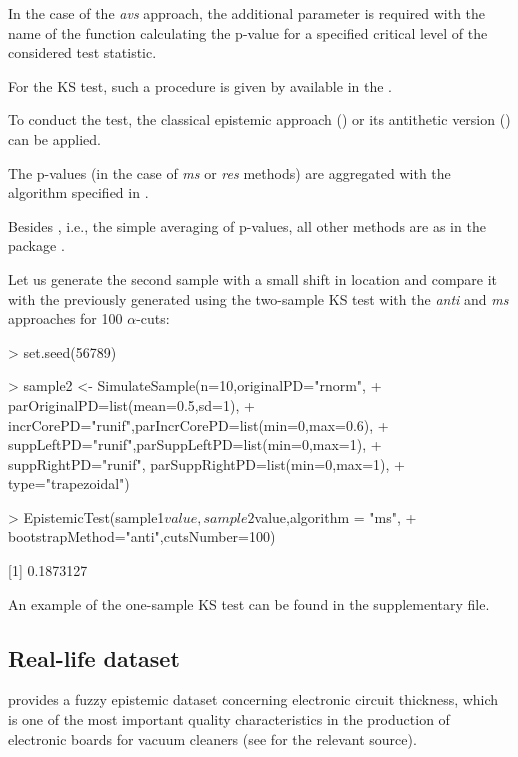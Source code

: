 In the case of the \emph{avs} approach, the additional parameter  is required with the name of the function  calculating the p-value for a specified critical level of the considered test statistic.

For the KS test, such a procedure is given by  available in the .

To conduct the test, the classical epistemic approach () or its antithetic version () can be applied.

The p-values (in the case of \emph{ms} or \emph{res} methods) are aggregated with the algorithm specified in .

Besides , i.e., the simple averaging of p-values, all other methods are as in the package  \citep{palassoArt}.

Let us generate the second sample with a small shift in location and compare it with the previously generated  using the two-sample KS test with the \emph{anti} and \emph{ms} approaches for 100 $\alpha$-cuts:

\begin{example}
> set.seed(56789)

> sample2 <- SimulateSample(n=10,originalPD="rnorm",
+  parOriginalPD=list(mean=0.5,sd=1),
+  incrCorePD="runif",parIncrCorePD=list(min=0,max=0.6),
+  suppLeftPD="runif",parSuppLeftPD=list(min=0,max=1),
+  suppRightPD="runif", parSuppRightPD=list(min=0,max=1),
+  type="trapezoidal")

> EpistemicTest(sample1$value,sample2$value,algorithm = "ms",
+  bootstrapMethod="anti",cutsNumber=100)

[1] 0.1873127
\end{example}

An example of the one-sample KS test can be found in the supplementary file. 


\subsection{Real-life dataset}

 provides a fuzzy epistemic dataset  concerning electronic circuit thickness, which is one of the most important quality characteristics in the production of electronic boards for vacuum cleaners (see \cite{FARAZ20102684} for the relevant source).

